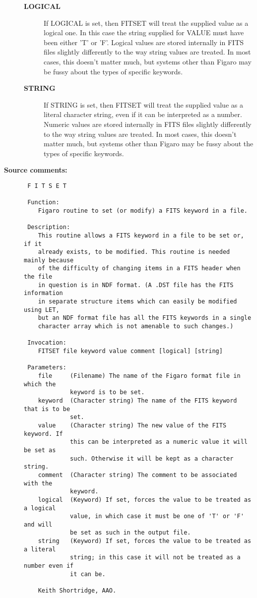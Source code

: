 \begin{description}
\begin{description}
\item [{\bf LOGICAL}]
 If LOGICAL is set, then FITSET will treat the supplied
 value as a logical one. In this case the string supplied for
 VALUE must have been either 'T' or 'F'. Logical values are
 stored internally in FITS files slightly differently to the
 way string values are treated. In most cases, this doesn't
 matter much, but systems other than Figaro may be fussy about
 the types of specific keywords.
\item [{\bf STRING}]
 If STRING is set, then FITSET will treat the supplied
 value as a literal character string, even if it can be
 interpreted as a number. Numeric values are stored internally
 in FITS files slightly differently to the way string values
 are treated. In most cases, this doesn't matter much, but
 systems other than Figaro may be fussy about the types of
 specific keywords.
\end{description}

\item [{\bf Source comments:}]
\begin{verbatim}
 F I T S E T

 Function:
    Figaro routine to set (or modify) a FITS keyword in a file.

 Description:
    This routine allows a FITS keyword in a file to be set or, if it
    already exists, to be modified. This routine is needed mainly because
    of the difficulty of changing items in a FITS header when the file
    in question is in NDF format. (A .DST file has the FITS information
    in separate structure items which can easily be modified using LET,
    but an NDF format file has all the FITS keywords in a single
    character array which is not amenable to such changes.)

 Invocation:
    FITSET file keyword value comment [logical] [string]

 Parameters:
    file     (Filename) The name of the Figaro format file in which the
             keyword is to be set.
    keyword  (Character string) The name of the FITS keyword that is to be
             set.
    value    (Character string) The new value of the FITS keyword. If
             this can be interpreted as a numeric value it will be set as
             such. Otherwise it will be kept as a character string.
    comment  (Character string) The comment to be associated with the
             keyword.
    logical  (Keyword) If set, forces the value to be treated as a logical
             value, in which case it must be one of 'T' or 'F' and will
             be set as such in the output file.
    string   (Keyword) If set, forces the value to be treated as a literal
             string; in this case it will not be treated as a number even if
             it can be.

    Keith Shortridge, AAO.
\end{verbatim}
\end{description}
